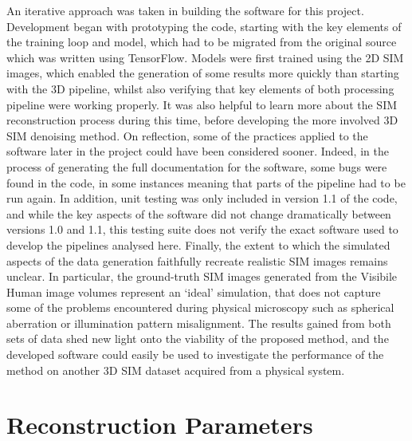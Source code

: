 \documentclass[12pt]{article}
\begin{document}
An iterative approach was taken in building the software for this project.
Development began with prototyping the code, starting with the key elements of the training loop and model,
which had to be migrated from the original source which was written using TensorFlow.
Models were first trained using the 2D SIM images,
which enabled the generation of some results more quickly than starting with the 3D pipeline,
whilst also verifying that key elements of both processing pipeline were working properly.
It was also helpful to learn more about the SIM reconstruction process during this time,
before developing the more involved 3D SIM denoising method.
On reflection, some of the practices applied to the software later in the project could have been considered sooner.
Indeed, in the process of generating the full documentation for the software,
some bugs were found in the code, in some instances meaning that parts of the pipeline had to be run again.
In addition, unit testing was only included in version 1.1 of the code,
and while the key aspects of the software did not change dramatically between versions 1.0 and 1.1,
this testing suite does not verify the exact software used to develop the pipelines analysed here.
Finally, the extent to which the simulated aspects of the data generation faithfully recreate realistic SIM images remains unclear.
In particular, the ground-truth SIM images generated from the Visibile Human image volumes represent an `ideal' simulation,
that does not capture some of the problems encountered during physical microscopy such as spherical aberration or illumination pattern misalignment.
The results gained from both sets of data shed new light onto the viability of the proposed method,
and the developed software could easily be used to investigate the performance of the method on another 3D SIM dataset acquired from a physical system.

\newpage




\newpage

\appendix

\section{Reconstruction Parameters}
\end{document}

